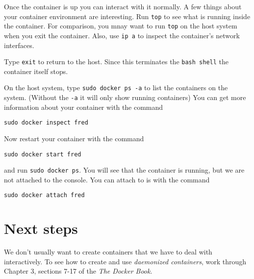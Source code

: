 \documentclass{article}
\begin{document}
Once the container is up you can interact with it normally.  A few things about your container environment are interesting. Run \texttt{top} to see what is running inside the container.  For comparison, you mnay want to run \texttt{top} on the host system when you exit the container.  Also, use \texttt{ip a} to inspect the container's network interfaces.

Type \texttt{exit} to return to the host. Since this terminates the \texttt{bash shell} the container itself stops.

On the host system, type \texttt{sudo docker ps -a} to list the containers on the system. (Without the \texttt{-a} it will only show running containers) You can get more information about your container with the command

\texttt{sudo docker inspect fred}

Now restart your container with the command 

\texttt{sudo docker start fred}

and run \texttt{sudo docker ps}.  You will see that the container is running, but we are not attached to the console.  You can attach to is with the command

\texttt{sudo docker attach fred}

\section{Next steps}
We don't usually want to create containers that we have to deal with interactively.  To see how to create and use \emph{daemonized containers}, work through  Chapter 3, sections 7-17 of the \emph{The Docker Book}.
\end{document}
